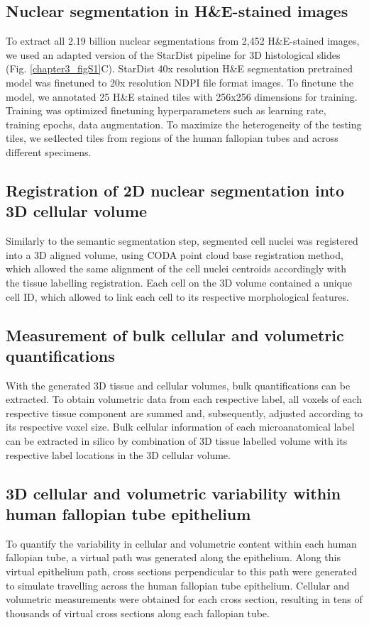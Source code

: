 \begin{refsection}
    \subsection{Nuclear segmentation in H\&E-stained images}
    To extract all 2.19 billion nuclear segmentations from 2,452 H\&E-stained images, we used an adapted version of the StarDist pipeline for 3D histological slides (Fig. \ref{chapter3_figS1}C)\cite{Forjaz2025Integration,Schmidt2018Cell}. StarDist 40x resolution H\&E segmentation pretrained model was finetuned to 20x resolution NDPI file format images\cite{Schmidt2018Cell}. To finetune the model, we annotated 25 H\&E stained tiles with 256x256 dimensions for training. Training was optimized finetuning hyperparameters such as learning rate, training epochs, data augmentation. To maximize the heterogeneity of the testing tiles, we se4lected tiles from regions of the human fallopian tubes and across different specimens.
    
    \subsection{Registration of 2D nuclear segmentation into 3D cellular volume}
    Similarly to the semantic segmentation step, segmented cell nuclei was registered into a 3D aligned volume, using CODA point cloud base registration method, which allowed the same alignment of the cell nuclei centroids accordingly with the tissue labelling registration\cite{Forjaz2025Integration}. Each cell on the 3D volume contained a unique cell ID, which allowed to link each cell to its respective morphological features. 
    
    \subsection{Measurement of bulk cellular and volumetric quantifications}
    With the generated 3D tissue and cellular volumes, bulk quantifications can be extracted. To obtain volumetric data from each respective label, all voxels of each respective tissue component are summed and, subsequently, adjusted according to its respective voxel size. Bulk cellular information of each microanatomical label can be extracted in silico by combination of 3D tissue labelled volume with its respective label locations in the 3D cellular volume.
    
    \subsection{3D cellular and volumetric variability within human fallopian tube epithelium}
    To quantify the variability in cellular and volumetric content within each human fallopian tube, a virtual path was generated along the epithelium. Along this virtual epithelium path, cross sections perpendicular to this path were generated to simulate travelling across the human fallopian tube epithelium. Cellular and volumetric measurements were obtained for each cross section, resulting in tens of thousands of virtual cross sections along each fallopian tube.
    

\end{refsection}
